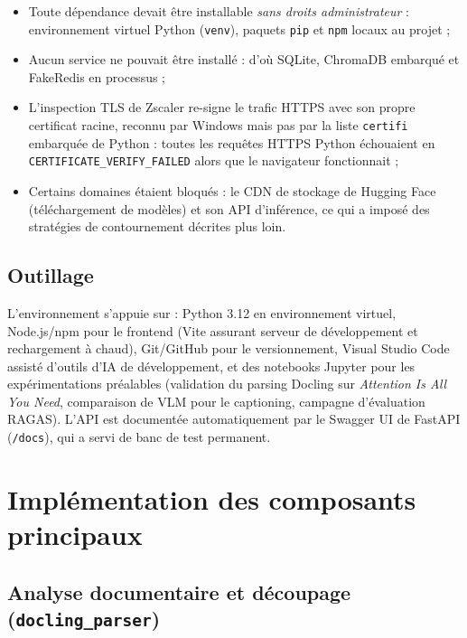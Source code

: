 \begin{alertbox}
\begin{itemize}
  \item Toute dépendance devait être installable \emph{sans droits administrateur} :
        environnement virtuel Python (\texttt{venv}), paquets \texttt{pip} et \texttt{npm}
        locaux au projet ;
  \item Aucun service ne pouvait être installé : d'où SQLite, ChromaDB embarqué et
        FakeRedis en processus ;
  \item L'inspection TLS de Zscaler re-signe le trafic HTTPS avec son propre certificat
        racine, reconnu par Windows mais pas par la liste \texttt{certifi} embarquée de
        Python : toutes les requêtes HTTPS Python échouaient en
        \texttt{CERTIFICATE\_VERIFY\_FAILED} alors que le navigateur fonctionnait ;
  \item Certains domaines étaient bloqués : le CDN de stockage de Hugging Face
        (téléchargement de modèles) et son API d'inférence, ce qui a imposé des
        stratégies de contournement décrites plus loin.
\end{itemize}
\end{alertbox}

\subsection{Outillage}

L'environnement s'appuie sur : Python 3.12 en environnement virtuel, Node.js/npm pour le
frontend (Vite assurant serveur de développement et rechargement à chaud), Git/GitHub pour
le versionnement, Visual Studio Code assisté d'outils d'IA de développement, et des
notebooks Jupyter pour les expérimentations préalables (validation du parsing Docling sur
\emph{Attention Is All You Need}, comparaison de VLM pour le captioning, campagne
d'évaluation RAGAS). L'API est documentée automatiquement par le Swagger UI de FastAPI
(\texttt{/docs}), qui a servi de banc de test permanent.

\section{Implémentation des composants principaux}
\label{sec:implementation}

\subsection{Analyse documentaire et découpage (\texttt{docling\_parser})}

